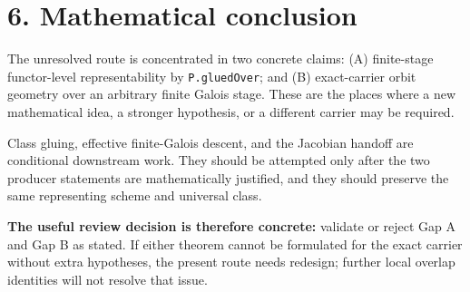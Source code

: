 \documentclass[10pt]{article}
\newcommand{\code}[1]{\texttt{\small #1}}
\newcommand{\statusbox}[3]{\par\noindent\colorbox{#1}{\parbox{0.95\linewidth}{\textcolor{#2}{#3}}}\par\medskip}
\begin{document}
\section*{6. Mathematical conclusion}
\statusbox{redbg}{redfg}{The unresolved route is concentrated in two concrete claims: (A) finite-stage functor-level representability by \code{P.gluedOver}; and (B) exact-carrier orbit geometry over an arbitrary finite Galois stage. These are the places where a new mathematical idea, a stronger hypothesis, or a different carrier may be required.}

\statusbox{bluebg}{bluefg}{Class gluing, effective finite-Galois descent, and the Jacobian handoff are conditional downstream work. They should be attempted only after the two producer statements are mathematically justified, and they should preserve the same representing scheme and universal class.}

\noindent\textbf{The useful review decision is therefore concrete:} validate or reject Gap A and Gap B as stated. If either theorem cannot be formulated for the exact carrier without extra hypotheses, the present route needs redesign; further local overlap identities will not resolve that issue.
\end{document}
